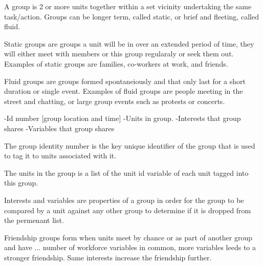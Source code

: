 





A group is 2 or more units together within a set vicinity undertaking the same task/action. Groups can be longer term, called static, or brief and fleeting, called fluid.

Static groups are groups a unit will be in over an extended period of time, they will either meet with members or this group regularaly or seek them out. Examples of static groups are families, co-workers at work, and friends. 

Fluid groups are groups formed spontaneiously and that only last for a short duration or single event. Examples of fluid groups are people meeting in the street and chatting, or large group events such as protests or concerts.


-Id number [group location and time]
-Units in group.
-Interests that group shares
-Variables that group shares

The group identity number is the key unique identifier of the group that is used to tag it to units associated with it.

The units in the group is a list of the unit id variable of each unit tagged into this group.

Interests and variables are properties of a group in order for the group to be compared by a unit against any other group to determine if it is dropped from the permenant list.



Friendship groups form when units meet by chance or as part of another group and have ... number of workforce variables in common, more variables leeds to a stronger friendship. Same interests increase the friendship further. 






